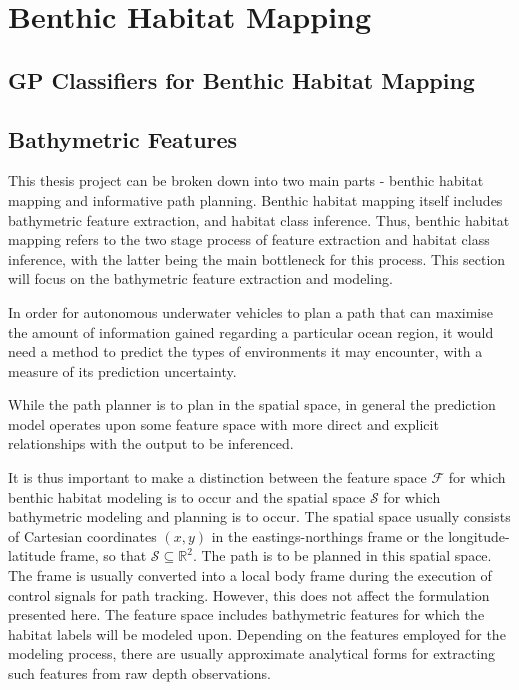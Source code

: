 \chapter{Benthic Habitat Mapping}
\label{BenthicHabitatMapping}
			
	\section{GP Classifiers for Benthic Habitat Mapping}
	\label{BenthicHabitatMapping:GaussianProcessClassifiers}
	
	\section{Bathymetric Features}
	\label{BenthicHabitatMapping:BathymetricFeatures}
	
		This thesis project can be broken down into two main parts - benthic habitat mapping and informative path planning. Benthic habitat mapping itself includes bathymetric feature extraction, and habitat class inference. Thus, benthic habitat mapping refers to the two stage process of feature extraction and habitat class inference, with the latter being the main bottleneck for this process. This section will focus on the bathymetric feature extraction and modeling.
			
		In order for autonomous underwater vehicles to plan a path that can maximise the amount of information gained regarding a particular ocean region, it would need a method to predict the types of environments it may encounter, with a measure of its prediction uncertainty.
		
		While the path planner is to plan in the spatial space, in general the prediction model operates upon some feature space with more direct and explicit relationships with the output to be inferenced.
		
		It is thus important to make a distinction between the feature space $\mathcal{F}$ for which benthic habitat modeling is to occur and the spatial space $\mathcal{S}$ for which bathymetric modeling and planning is to occur. The spatial space usually consists of Cartesian coordinates $(x, y)$ in the eastings-northings frame or the longitude-latitude frame, so that $\mathcal{S} \subseteq \mathbb{R}^{2}$. The path is to be planned in this spatial space. The frame is usually converted into a local body frame during the execution of control signals for path tracking. However, this does not affect the formulation presented here. The feature space includes bathymetric features for which the habitat labels will be modeled upon. Depending on the features employed for the modeling process, there are usually approximate analytical forms for extracting such features from raw depth observations.
		
